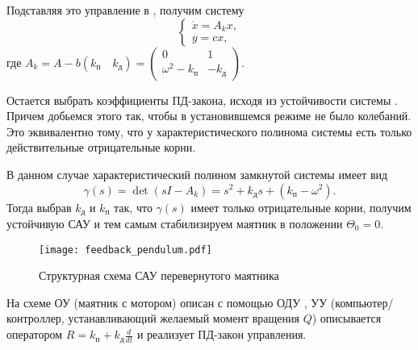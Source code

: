 \documentclass[../../TAU.tex]{subfiles}
\begin{document}
    Подставляя это управление в , получим систему
    \begin{equation}\label{EQ1_2}
    \begin{cases}
    \dot x = A_kx,\\
    y = c x,
    \end{cases}
    \end{equation}
    где $A_k = A - b(k_\text{п}\quad k_\text{д})=\begin{pmatrix}0 & 1\\ \omega^2 - k_\text{п}& - k_\text{д}\end{pmatrix}$.

    Остается выбрать коэффициенты ПД-закона, исходя из устойчивости системы . Причем добьемся этого так, чтобы в установившемся режиме не было колебаний. Это эквивалентно тому, что у характеристического полинома системы  есть только действительные отрицательные корни.

    В данном случае характеристический полином замкнутой системы имеет вид
    $$
    \gamma(s) = \det (sI-A_k) = s^2+ k_\text{д}s+(k_\text{п}-\omega^2).
    $$
    Тогда выбрав $k_\text{д}$ и $k_\text{п}$ так, что $\gamma(s)$ имеет только отрицательные корни, получим устойчивую САУ и тем самым стабилизируем маятник в положении $\Theta_0 = 0$.

    \begin{figure}[h]
    \centering
    \texttt{[image: feedback\_pendulum.pdf]}
    \caption{Структурная схема САУ перевернутого маятника}
    \centering
    \end{figure}


    На схеме ОУ (маятник с мотором) описан с помощью ОДУ , УУ (компьютер/контроллер, устанавливающий желаемый момент вращения $Q$) описывается оператором $R = k_\text{п}+k_\text{д}\frac{d}{dt}$ и реализует ПД-закон управления.
\end{document}
